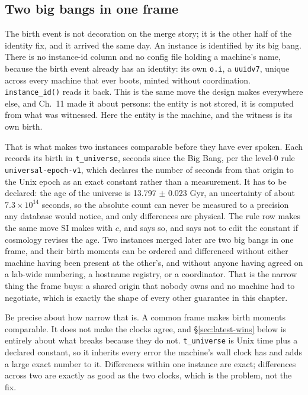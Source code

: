 \subsection{Two big bangs in one frame}

The birth event is not decoration on the merge story; it is the other half of the identity fix, and it arrived the same day. An instance is identified by its big bang. There is no instance-id column and no config file holding a machine's name, because the birth event already has an identity: its own \texttt{o.i}, a \texttt{uuidv7}, unique across every machine that ever boots, minted without coordination. \texttt{instance\_id()} reads it back. This is the same move the design makes everywhere else, and Ch.~11 made it about persons: the entity is not stored, it is computed from what was witnessed. Here the entity is the machine, and the witness is its own birth.

That is what makes two instances comparable before they have ever spoken. Each records its birth in \texttt{t\_universe}, seconds since the Big Bang, per the level-0 rule \texttt{universal-epoch-v1}, which declares the number of seconds from that origin to the Unix epoch as an exact constant rather than a measurement. It has to be declared: the age of the universe is 13.797 $\pm$ 0.023 Gyr, an uncertainty of about $7.3\times10^{14}$ seconds, so the absolute count can never be measured to a precision any database would notice, and only differences are physical. The rule row makes the same move SI makes with $c$, and says so, and says not to edit the constant if cosmology revises the age. Two instances merged later are two big bangs in one frame, and their birth moments can be ordered and differenced without either machine having been present at the other's, and without anyone having agreed on a lab-wide numbering, a hostname registry, or a coordinator. That is the narrow thing the frame buys: a shared origin that nobody owns and no machine had to negotiate, which is exactly the shape of every other guarantee in this chapter.

Be precise about how narrow that is. A common frame makes birth moments comparable. It does not make the clocks agree, and \S\ref{sec:latest-wins} below is entirely about what breaks because they do not. \texttt{t\_universe} is Unix time plus a declared constant, so it inherits every error the machine's wall clock has and adds a large exact number to it. Differences within one instance are exact; differences across two are exactly as good as the two clocks, which is the problem, not the fix.

